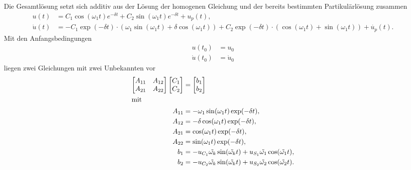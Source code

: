 \begin{solution}
    Die Gesamtlösung setzt sich additiv aus der Lösung der homogenen Gleichung und der bereits bestimmten Partikulärlösung zusammen
    \begin{align*}
        u(t) &= C_1\cos(\omega_1 t)e^{-\delta t} + C_2 \sin(\omega_1 t)e^{-\delta t} + u_p(t),\\
        \dot{u}(t) &= -C_1 \exp(-\delta t) \cdot (\omega_1 \sin(\omega_1 t) + \delta \cos(\omega_1 t)) + C_2 \exp(-\delta t) \cdot (\cos(\omega_1 t) + \sin(\omega_1 t)) + \dot{u_p}(t).
    \end{align*}
    Mit den Anfangsbedingungen
    \begin{align*}
        u(t_0) &= u_0 \\
        \dot{u}(t_0) &= \dot{u}_0
    \end{align*}
    liegen zwei Gleichungen mit zwei Unbekannten vor
    \begin{align*}
    \begin{bmatrix}
        A_{11} & A_{12}\\
        A_{21} & A_{22}
    \end{bmatrix}
    \begin{bmatrix}
        C_1 \\
        C_2
    \end{bmatrix}
    &=
    \begin{bmatrix}
    b_1 \\
    b_2
    \end{bmatrix} \\
    \intertext{mit}
        A_{11}&= -\omega_1 \sin(\omega_1 t) \exp(-\delta t),\\
        A_{12}&= - \delta \cos(\omega_1 t) \exp(-\delta t),\\
        A_{21}&= \cos(\omega_1 t) \exp(-\delta t),\\
        A_{22}&= \sin(\omega_1 t) \exp(-\delta t),\\
        b_{1}&= -u_{C_1} \tilde{\omega_k} \sin(\tilde{\omega_k}t) + u_{S_1} \tilde{\omega_1} \cos(\tilde{\omega_1}t),\\
        b_{2}&= -u_{C_2} \tilde{\omega_k} \sin(\tilde{\omega_k}t) + u_{S_2} \tilde{\omega_2} \cos(\tilde{\omega_2}t).
    \end{align*}


\end{solution}
